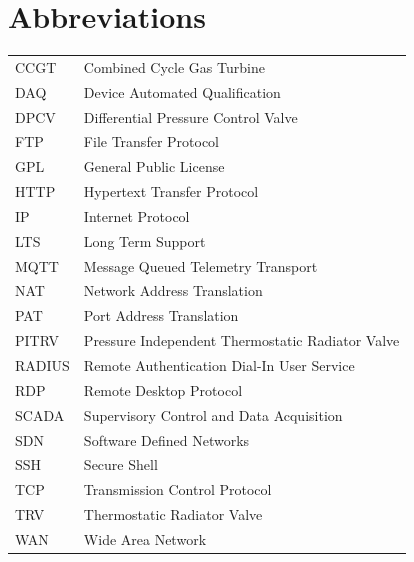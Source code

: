 \documentclass[11pt, oneside]{book}   	%
\begin{document}
\chapter*{Abbreviations}
\begin{table}[H]
	\begin{center}
	\begin{tabular}{ l  l }
	CCGT&Combined Cycle Gas Turbine\\
	DAQ&Device Automated Qualification\\
	DPCV&Differential Pressure Control Valve\\
	FTP&File Transfer Protocol\\
	GPL&General Public License\\
	HTTP&Hypertext Transfer Protocol\\
	IP&Internet Protocol\\
	LTS&Long Term Support\\
	MQTT&Message Queued Telemetry Transport\\
	NAT&Network Address Translation\\
	PAT&Port Address Translation\\
	PITRV&Pressure Independent Thermostatic Radiator Valve\\
	RADIUS&Remote Authentication Dial-In User Service\\
	RDP&Remote Desktop Protocol\\
	SCADA&Supervisory Control and Data Acquisition\\
	SDN&Software Defined Networks\\
	SSH&Secure Shell\\
	TCP&Transmission Control Protocol\\
	TRV&Thermostatic Radiator Valve\\
	WAN&Wide Area Network\\
	\end{tabular}
	\end{center}
	\label{Abbreviations}
\end{table}

\newpage
\thispagestyle{empty}
\mbox{}
\newpage

\newpage

\tableofcontents

\newpage
\thispagestyle{empty}
\mbox{}
\newpage

\newpage
\thispagestyle{empty}
\mbox{}
\newpage

\end{document}
